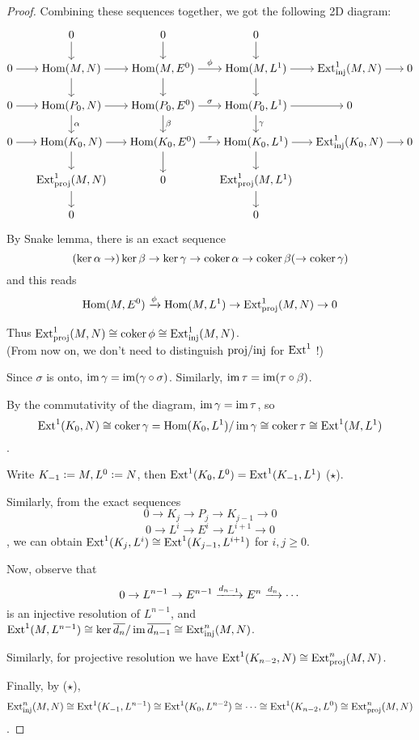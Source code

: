 \begin{theorem}
\begin{proof}
    Combining these sequences together, we got the following 2D diagram:

    $$
      \begin{tikzcd}[cramped, sep=15pt]
        & 0 \ar[d] & 0 \ar[d] & 0 \ar[d] \\
        0 \ar[r] & \Hom(M, N) \ar[r] \ar[d] & \Hom(M, E^0) \ar[r, "\phi"] \ar[d] &
        \Hom(M, L^1) \ar[r] \ar[d] & \Ext_\inj^1(M, N) \ar[r] & 0 \\
        0 \ar[r] & \Hom(P_0, N) \ar[r] \ar[d, "\alpha"] & \Hom(P_0, E^0) \ar[r, "\sigma"] \ar[d, "\beta"] &
        \Hom(P_0, L^1) \ar[r] \ar[d, "\gamma"] & 0 \\
        0 \ar[r] & \Hom(K_0, N) \ar[r] \ar[d] & \Hom(K_0, E^0) \ar[r, "\tau"] \ar[d] &
        \Hom(K_0, L^1) \ar[r] \ar[d] & \Ext_\inj^1(K_0, N) \ar[r] & 0 \\
        & \Ext_\proj^1(M, N) \ar[d] & 0 & \Ext_\proj^1(M, L^1) \ar[d] \\
        & 0 & & 0
      \end{tikzcd}
    $$

    By Snake lemma, there is an exact sequence
    $$(\ker \alpha \to )\ker \beta \to \ker \gamma \to \operatorname{coker} \alpha \to \operatorname{coker} \beta( \to \operatorname{coker} \gamma)$$
    and this reads
    $$\operatorname{Hom} (M, E^0) \xrightarrow{\phi} \operatorname{Hom}(M, L^1) \to \operatorname{Ext}_{\mathrm{proj}}^1(M, N) \to 0$$

    Thus $\operatorname{Ext}_{\mathrm{proj}}^1(M, N) \cong \operatorname{coker} \phi \cong \operatorname{Ext}_{\mathrm{inj}}^1(M, N)$.\\
    (From now on, we don't need to distinguish $\mathrm{proj} / \mathrm{inj}$ for $\operatorname{Ext}^1$ !)

    \vspace{10pt}

    Since $\sigma$ is onto, $\operatorname{im} \gamma = \operatorname{im} (\gamma \circ \sigma)$.
    Similarly, $\operatorname{im} \tau = \operatorname{im} (\tau \circ \beta)$.

    By the commutativity of the diagram, $\operatorname{im} \gamma = \operatorname{im} \tau$, so
    $$\operatorname{Ext}^1(K_0, N) \cong \operatorname{coker} \gamma = \operatorname{Hom}(K_0, L^1)/\operatorname{im} \gamma
    \cong \operatorname{coker} \tau \cong \operatorname{Ext}^1(M, L^1)$$.

    Write $K_{-1} \vcentcolon= M, L^0 \vcentcolon= N$, then $\operatorname{Ext}^1(K_0, L^0) = \operatorname{Ext}^1(K_{-1}, L^1)$ ($\star$).

    Similarly, from the exact sequences
    $$ 0 \to K_j \to P_j \to K_{j-1} \to 0 $$
    $$ 0 \to L^i \to E^i \to L^{i+1} \to 0 $$,
    we can obtain $\operatorname{Ext}^1(K_j, L^i) \cong \operatorname{Ext}^1(K_{j-1}, L^{i+1})$ for $i, j \geq 0$.

    Now, observe that
    $$0 \to L^{n-1} \to E^{n-1} \xrightarrow{d_{n-1}} E^n \xrightarrow{d_n} \cdots$$
    is an injective resolution of $L^{n-1}$, and
    $\operatorname{Ext}^1(M, L^{n-1}) \cong \ker \overline{d_n} / \operatorname{im} \overline{d_{n-1}} \cong \operatorname{Ext}_{\mathrm{inj}}^n(M, N)$.

    Similarly, for projective resolution we have $\operatorname{Ext}^1(K_{n-2}, N) \cong \operatorname{Ext}_{\mathrm{proj}}^n(M, N)$.

    Finally, by ($\star$),  
    $$\operatorname{Ext}_{\mathrm{inj}}^n(M, N) \cong \operatorname{Ext}^1(K_{-1}, L^{n-1}) \cong \operatorname{Ext}^1(K_0, L^{n-2}) \cong \cdots
    \cong \operatorname{Ext}^1(K_{n-2}, L^0) \cong \operatorname{Ext}_{\mathrm{proj}}^n(M, N)$$.

  \end{proof}
\end{theorem}

